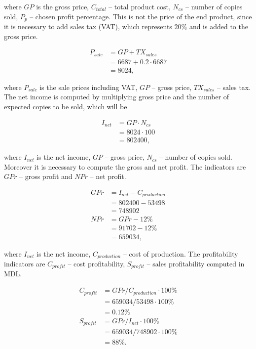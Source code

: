 \noindent
where $GP$ is the gross price, $C_{total}$ -- total product cost, $N_{cs}$ -- number of copies sold, $P_{p}$ -- chosen profit percentage. This is not the price of the end product, since it is necessary to add sales tax (VAT), which represents $20\%$ and is added to the gross price. 

\begin{equation}
\begin{split}
P_{sale} &= GP + TX_{sales}\\
&= 6687 + 0.2 \cdot 6687 \\
&= 8024,
\end{split}
\end{equation}

\noindent
where $P_{sale}$ is the sale prices including VAT, $GP$ -- gross price, $TX_{sales}$ -- sales tax. The net income is computed by multiplying gross price and the number of expected copies to be sold, which will be

\begin{equation}
\begin{split}
I_{net} &= GP \cdot N_{cs}\\
&= 8024  \cdot 100 \\
&= 802400,
\end{split}
\end{equation}

\noindent
where $I_{net}$ is the net income, $GP$ -- gross price, $N_{cs}$ -- number of copies sold. Moreover it is necessary to compute the gross and net profit. The indicators are $GPr$ -- gross profit and $NPr$ -- net profit.

\begin{equation}
\begin{split}
GPr &= I_{net} - C_{production}\\
&= 802400 - 53498\\
&= 748902\\
NPr &= GPr - 12\% \\
&= 91702 - 12\% \\
&= 659034,
\end{split}
\end{equation}

\noindent
where $I_{net}$ is the net income, $C_{production}$ -- cost of production. The profitability indicators are $C_{profit}$ -- cost profitability, $S_{profit}$ -- sales profitability computed in MDL.

\begin{equation}
\begin{split}
C_{profit} &= GPr / C_{production} \cdot 100\%\\
&= 659034 / 53498 \cdot 100\% \\
&= 0.12 \%\\
S_{profit} &= GPr / I_{net} \cdot 100\% \\
&= 659034 / 748902 \cdot 100\% \\
&= 88 \%.
\end{split}
\end{equation}
